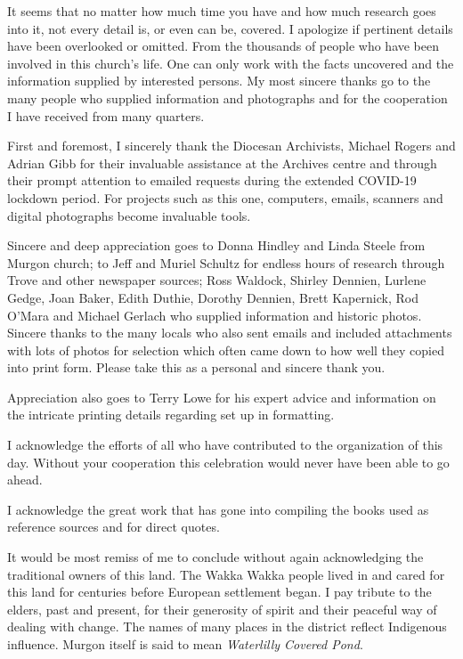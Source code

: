 It seems that no matter how much time you have and how much research goes into it, not every detail is, or even can be, covered. I apologize if pertinent details have been overlooked or omitted. From the thousands of people who have been involved in this church's life. One can only work with the facts uncovered and the information supplied by interested persons. My most sincere thanks go to the many people who supplied information and photographs and for the cooperation I have received from many quarters.



First and foremost, I sincerely thank the Diocesan Archivists, Michael Rogers and Adrian Gibb for their invaluable assistance at the Archives centre and through their prompt attention to emailed requests during the extended COVID-19 lockdown period. For projects such as this one, computers, emails, scanners and digital photographs become invaluable tools.



Sincere and deep appreciation goes to Donna Hindley and Linda Steele from Murgon church; to Jeff and Muriel Schultz for endless hours of research through Trove and other newspaper sources; Ross Waldock, Shirley Dennien, Lurlene Gedge, Joan Baker, Edith Duthie, Dorothy Dennien, Brett Kapernick, Rod O'Mara and Michael Gerlach who supplied information and historic photos. Sincere thanks to the many locals who also sent emails and included attachments with lots of photos for selection which often came down to how well they copied into print form. Please take this as a personal and sincere thank you.



Appreciation also goes to Terry Lowe for his expert advice and information on the intricate printing details regarding set up in formatting.



I acknowledge the efforts of all who have contributed to the organization of this day. Without your cooperation this celebration would never have been able to go ahead.



I acknowledge the great work that has gone into compiling the books used as reference sources and for direct quotes.



It would be most remiss of me to conclude without again acknowledging the traditional owners of this land. The Wakka Wakka people lived in and cared for this land for centuries before European settlement began. I pay tribute to the elders, past and present, for their generosity of spirit and their peaceful way of dealing with change. The names of many places in the district reflect Indigenous influence. Murgon itself is said to mean \emph{Waterlilly Covered Pond}.



